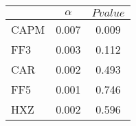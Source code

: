 \begin{tabular}{lcc}
\toprule
 & $\alpha$ & $Pvalue$ \\
\midrule
CAPM & 0.007 & 0.009 \\
FF3 & 0.003 & 0.112 \\
CAR & 0.002 & 0.493 \\
FF5 & 0.001 & 0.746 \\
HXZ & 0.002 & 0.596 \\
\bottomrule
\end{tabular}
